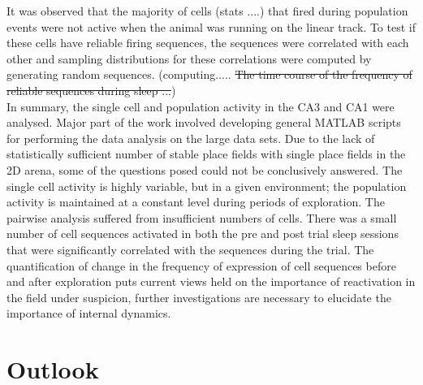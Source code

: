 It was observed that the majority of cells (stats ....) that fired during population events were not active when the animal was running on the linear track. To test if these cells have reliable firing sequences, the sequences were correlated with each other and sampling distributions for these correlations were computed by generating random sequences. (computing..... \st{The time course of the frequency of reliable sequences during sleep ...})\\

In summary, the single cell and population activity in the CA3 and CA1 were analysed. Major part of the work involved developing general MATLAB scripts for performing the data analysis on the large data sets. Due to the lack of statistically sufficient number of stable place fields with single place fields in the 2D arena, some of the questions posed could not be conclusively answered. The single cell activity is highly variable, but in a given environment; the population activity is maintained at a constant level during periods of exploration. The pairwise analysis suffered from insufficient numbers of cells. There was a small number of cell sequences activated in both the pre and post trial sleep sessions that were significantly correlated with the sequences during the trial. The quantification of change in the frequency of expression of cell sequences before and after exploration puts current views held on the importance of reactivation in the field under suspicion, further investigations are necessary to elucidate the importance of internal dynamics. 

\section*{Outlook}




